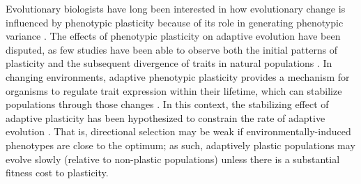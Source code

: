 \begin{raggedbottom}
Evolutionary biologists have long been interested in how evolutionary change is influenced by phenotypic plasticity because of its role in generating phenotypic variance \citep{gibert_phenotypic_2019}.
The effects of phenotypic plasticity on adaptive evolution have been disputed, as few studies have been able to observe both the initial patterns of plasticity and the subsequent divergence of traits in natural populations \citep{ghalambor_adaptive_2007,wund_assessing_2012,forsman_rethinking_2015,ghalambor_non-adaptive_2015,hendry_key_2016}.
In changing environments, adaptive phenotypic plasticity provides a mechanism for organisms to regulate trait expression within their lifetime, which can stabilize populations through those changes \citep{gibert_phenotypic_2019}.
In this context, the stabilizing effect of adaptive plasticity has been hypothesized to constrain the rate of adaptive evolution \citep{gupta_study_1982,ancel_undermining_2000,huey_behavioral_2003,price_role_2003,paenke_influence_2007}.
That is, directional selection may be weak if environmentally-induced phenotypes are close to the optimum; as such, adaptively plastic populations may evolve slowly (relative to non-plastic populations) unless there is a substantial fitness cost to plasticity.


\end{raggedbottom}
